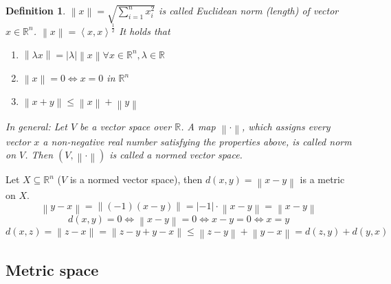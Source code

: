 \documentclass{article}
\newtheorem{definition}{Definition}  \numberwithin{definition}{section}
\newcommand{\angel}[1]{\left\langle#1\right\rangle}
\newcommand{\norm}[1]{\left\|#1\right\|}
\newcommand{\card}[1]{\left|#1\right|}
\begin{document}
\begin{definition}
  $\norm{x} = \sqrt{\sum_{i=1}^n x_i^2}$ is called \emph{Euclidean norm} (length) of vector $x \in \mathbb R^n$. $\norm{x} = \angel{x, x}^{\frac12}$
  It holds that
  \begin{enumerate}
    \item $\norm{\lambda x} = \card{\lambda} \norm{x} \forall x \in \mathbb R^n, \lambda \in \mathbb R$
    \item $\norm{x} = 0 \iff x = 0$ in $\mathbb R^n$
    \item $\norm{x + y} \leq \norm{x} + \norm{y}$
  \end{enumerate}

  In general: Let $V$ be a vector space over $\mathbb R$. A map $\norm\cdot$, which assigns every vector $x$ a non-negative real number satisfying the properties above,
  is called \emph{norm on $V$}. Then $(V, \norm\cdot)$ is called a \emph{normed vector space}.
\end{definition}

Let $X \subseteq \mathbb R^n$ ($V$ is a normed vector space), then $d(x, y) = \norm{x - y}$ is a metric on $X$.
\[ \norm{y - x} = \norm{(-1) (x - y)} = \card{-1} \cdot \norm{x - y} = \norm{x - y} \]
\[ d(x, y) = 0 \iff \norm{x - y} = 0 \iff x - y = 0 \iff x = y \]
\[ d(x, z) = \norm{z - x} = \norm{z - y + y - x} \leq \norm{z - y} + \norm{y - x} = d(z, y) + d(y, x) \]

\subsection{Metric space}
\end{document}
